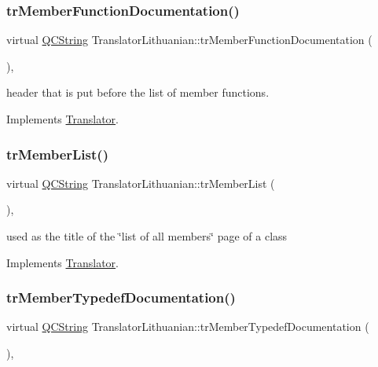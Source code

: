 \subsubsection{\texorpdfstring{trMemberFunctionDocumentation()}{trMemberFunctionDocumentation()}}
{\footnotesize\ttfamily virtual \mbox{\hyperlink{class_q_c_string}{Q\+C\+String}} Translator\+Lithuanian\+::tr\+Member\+Function\+Documentation (\begin{DoxyParamCaption}{ }\end{DoxyParamCaption})\hspace{0.3cm}{\ttfamily [inline]}, {\ttfamily [virtual]}}

header that is put before the list of member functions. 

Implements \mbox{\hyperlink{class_translator}{Translator}}.

\mbox{\label{class_translator_lithuanian_ad8814da381f35abddeeeeab569473fa9}} 
\subsubsection{\texorpdfstring{trMemberList()}{trMemberList()}}
{\footnotesize\ttfamily virtual \mbox{\hyperlink{class_q_c_string}{Q\+C\+String}} Translator\+Lithuanian\+::tr\+Member\+List (\begin{DoxyParamCaption}{ }\end{DoxyParamCaption})\hspace{0.3cm}{\ttfamily [inline]}, {\ttfamily [virtual]}}

used as the title of the \char`\"{}list of all members\char`\"{} page of a class 

Implements \mbox{\hyperlink{class_translator}{Translator}}.

\mbox{\label{class_translator_lithuanian_a49c28b64285d33d3eb695d908cab4c66}} 
\subsubsection{\texorpdfstring{trMemberTypedefDocumentation()}{trMemberTypedefDocumentation()}}
{\footnotesize\ttfamily virtual \mbox{\hyperlink{class_q_c_string}{Q\+C\+String}} Translator\+Lithuanian\+::tr\+Member\+Typedef\+Documentation (\begin{DoxyParamCaption}{ }\end{DoxyParamCaption})\hspace{0.3cm}{\ttfamily [inline]}, {\ttfamily [virtual]}}

